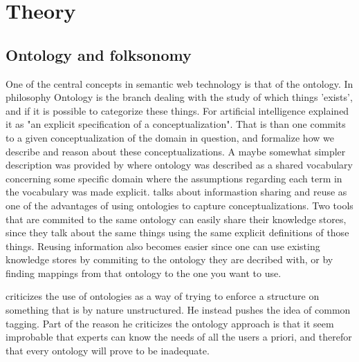 
\chapter{Theory} %
\label{Theory} %


\section{Ontology and folksonomy}
One of the central concepts in semantic web technology is that of the ontology.
In philosophy Ontology is the branch dealing with the study of which things 'exists', and if it is possible to categorize these things.
For artificial intelligence \citet{Gruber1993} explained it as "an explicit specification of a conceptualization".
That is than one commits to a given conceptualization of the domain in question, and formalize how we describe and reason about these conceptualizations.
A maybe somewhat simpler description was provided by \citet{Guarino1998} where ontology was described as a shared vocabulary
concerning some specific domain where the assumptions regarding each term in the vocabulary was made explicit.
\citet{Pretorius2004} talks about informastion sharing and reuse as one of the advantages of using ontologies to
capture conceptualizations.
Two tools that are commited to the same ontology can easily share their knowledge stores,
since they talk about the same things using the same explicit definitions of those things.
Reusing information also becomes easier since one can use existing knowledge stores by commiting to the ontology they are
decribed with, or by finding mappings from that ontology to the one you want to use.


\citet{Shirky2007} criticizes the use of ontologies as a way of trying to enforce a structure on something that is by nature unstructured.
He instead pushes the idea of common tagging.
Part of the reason he criticizes the ontology approach is that it seem improbable that experts can know the needs of all the users a priori, and therefor that every ontology will prove to be inadequate.

